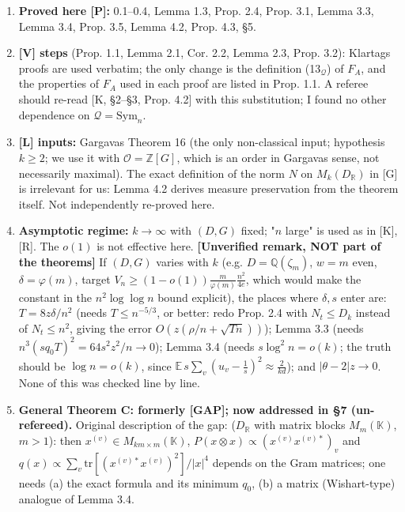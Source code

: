 \begin{enumerate}
\def\labelenumi{\arabic{enumi}.}
\item
  \textbf{Proved here {[}P{]}:} 0.1--0.4, Lemma 1.3, Prop. 2.4, Prop. 3.1, Lemma 3.3, Lemma 3.4, Prop. 3.5, Lemma 4.2, Prop. 4.3, §5.
\item
  \textbf{{[}V{]} steps} (Prop. 1.1, Lemma 2.1, Cor. 2.2, Lemma 2.3, Prop. 3.2): Klartag\textquotesingle s proofs are used verbatim; the only change is the definition (13\(_\mathcal Q\)) of \(F_A\), and the
  properties of \(F_A\) used in each proof are listed in Prop. 1.1. A referee should re-read {[}K, §2--§3, Prop. 4.2{]} with this substitution; I found no other dependence on \(\mathcal Q=\mathrm{Sym}_n\).
\item
  \textbf{{[}L{]} inputs:} Gargava\textquotesingle s Theorem 16 (the only non-classical input; hypothesis \(k\ge2\); we use it with \(\mathcal O=\mathbb Z[G]\), which is an order in Gargava\textquotesingle s sense, not
  necessarily maximal). The exact definition of the norm \(N\) on \(M_k(D_\mathbb R)\) in {[}G{]} is irrelevant for us: Lemma 4.2 derives measure preservation from the theorem itself.
  Not independently re-proved here.
\item
  \textbf{Asymptotic regime:} \(k\to\infty\) with \((D,G)\) fixed; "\(n\) large" is used as in {[}K{]},{[}R{]}. The \(o(1)\) is not effective here.
  \textbf{{[}Unverified remark, NOT part of the theorems{]}} If \((D,G)\) varies with \(k\) (e.g. \(D=\mathbb Q(\zeta_m)\), \(w=m\) even, \(\delta=\varphi(m)\), target
  \(V_n\ge(1-o(1))\frac m{\varphi(m)}\frac{n^2}{4e}\), which would make the constant in the \(n^2\log\log n\) bound explicit), the places where \(\delta,s\) enter are:
  \(T=8z\delta/n^2\) (needs \(T\le n^{-5/3}\), or better: redo Prop. 2.4 with \(N_t\le D_k\) instead of \(N_t\le n^2\), giving the error \(O(z(\rho/n+\sqrt{Tn}))\));
  Lemma 3.3 (needs \(n^3(sq_0T)^2=64s^2z^2/n\to0\)); Lemma 3.4 (needs \(s\log^2n=o(k)\); the truth should be \(\log n=o(k)\), since
  \(\mathbb E\,s\sum_v(u_v-\frac1s)^2\approx\frac{2}{kd}\)); and \(|\theta-2|z\to0\). None of this was checked line by line.
\item
  \textbf{General Theorem C: formerly {[}GAP{]}; now addressed in §7 (un-refereed).} Original description of the gap: (\(D_\mathbb R\) with matrix blocks \(M_{m}(\mathbb K)\), \(m>1\)): then \(x^{(v)}\in M_{km\times m}(\mathbb K)\), \(P(x\otimes x)\propto(x^{(v)}x^{(v)*})_v\) and
  \(q(x)\propto\sum_v\mathrm{tr}[(x^{(v)*}x^{(v)})^2]/|x|^4\) depends on the Gram matrices; one needs (a) the exact formula and its minimum \(q_0\), (b) a matrix (Wishart-type) analogue of Lemma 3.4.

\end{enumerate}
